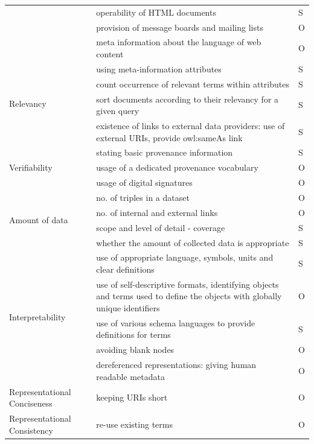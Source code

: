 \begin{longtable}{ | p{3cm} | p{10cm} | >{\centering\arraybackslash}p{2cm}| }
& operability of HTML documents & S\\
\cline{2-3}
& provision of message boards and mailing lists & O\\
\cline{2-3}
& meta information about the language of web content & O\\
\hline
\multirow{4}{*}{Relevancy} & using meta-information attributes & S\\
\cline{2-3}
& count occurrence of relevant terms within attributes & S\\
\cline{2-3}
& sort documents according to their relevancy for a given query & S\\
\cline{2-3}
& existence of links to external data providers: use of external URIs, provide owl:sameAs link & S\\
\hline
\multirow{3}{*}{Verifiability} & stating basic provenance information & S\\
\cline{2-3}
& usage of a dedicated provenance vocabulary & O\\
\cline{2-3}
& usage of digital signatures & O\\
\hline
\multirow{4}{*}{Amount of data} & no. of triples in a dataset & O\\
\cline{2-3}
& no. of internal and external links & O\\
\cline{2-3}
& scope and level of detail - coverage & S\\
\cline{2-3}
& whether the amount of collected data is appropriate & S\\
\hline
\multirow{5}{*}{Interpretability} & use of appropriate language, symbols, units and clear definitions & S\\
\cline{2-3}
& use of self-descriptive formats, identifying objects and terms used to define the objects with globally unique identifiers & O\\
\cline{2-3}
& use of various schema languages to provide definitions for terms & S\\
\cline{2-3}
& avoiding blank nodes & O\\
\cline{2-3}
& dereferenced representations: giving human readable metadata & O\\
\hline
Representational Conciseness & keeping URIs short & O\\
\hline
\multirow{3}{*}{Representational Consistency} & re-use existing terms & O\\

\end{longtable}
